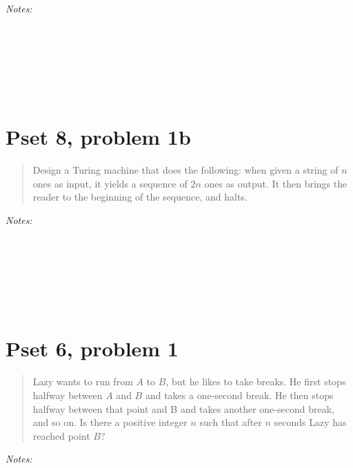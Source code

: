 \documentclass[justified]{tufte-handout}
\begin{document}
\noindent \emph{Notes:}  \underline{\hspace{15.4cm}}\\\\\underline{\hspace{16.43cm}}\\\\\underline{\hspace{16.43cm}}\\\\\underline{\hspace{16.43cm}}\\

\section{Pset 8, problem 1b}

\begin{quote}Design a Turing machine that does the following: when given a string of $n$ ones as input, it yields a sequence of $2n$ ones as output. It then brings the reader to the beginning of the sequence, and halts.\end{quote}

\noindent \emph{Notes:}  \underline{\hspace{15.4cm}}\\\\\underline{\hspace{16.43cm}}\\\\\underline{\hspace{16.43cm}}\\\\\underline{\hspace{16.43cm}}\\

\section{Pset 6, problem 1}

\begin{quote}Lazy wants to run from $A$ to $B$, but he likes to take breaks. He first stops halfway between $A$ and $B$ and takes a one-second break. He then stops halfway between that point and B and takes another one-second break, and so on. Is there a positive integer $n$ such that after $n$ seconds Lazy has reached point $B$?\end{quote}

\noindent \emph{Notes:}  \underline{\hspace{15.4cm}}\\\\\underline{\hspace{16.43cm}}\\\\\underline{\hspace{16.43cm}}\\\\\underline{\hspace{16.43cm}}\\
\end{document}
